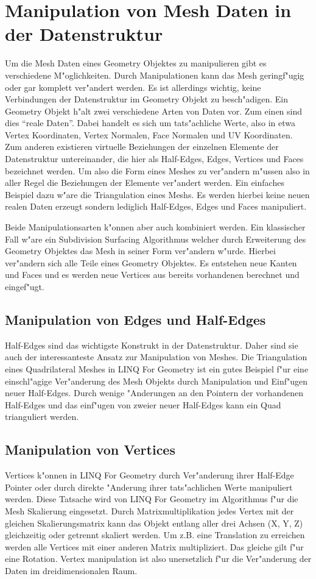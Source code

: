 \documentclass[pagesize, paper=a4, fontsize=12pt,titlepage=true, headings=small, headnosepline, abstractoff, liststotoc, nochapterprefix, plainheadsepline]{scrreprt}
\newcommand{\LFGS}{LINQ For Geometry }
\begin{document}
	\section {Manipulation von Mesh Daten in der Datenstruktur}
		Um die Mesh Daten eines Geometry Objektes zu manipulieren gibt es verschiedene M"oglichkeiten. Durch Manipulationen kann das Mesh geringf"ugig oder gar komplett ver"andert werden. Es ist allerdings wichtig, keine Verbindungen der Datenstruktur im Geometry Objekt zu besch"adigen. Ein Geometry Objekt h"alt zwei verschiedene Arten von Daten vor. Zum einen sind dies "`reale Daten"'. Dabei handelt es sich um tats"achliche Werte, also in etwa Vertex Koordinaten, Vertex Normalen, Face Normalen und UV Koordinaten. Zum anderen existieren virtuelle Beziehungen der einzelnen Elemente der Datenstruktur untereinander, die hier als Half-Edges, Edges, Vertices und Faces bezeichnet werden. Um also die Form eines Meshes zu ver"andern m"ussen also in aller Regel die Beziehungen der Elemente ver"andert werden. Ein einfaches Beispiel dazu w"are die Triangulation eines Meshs. Es werden hierbei keine neuen realen Daten erzeugt sondern lediglich Half-Edges, Edges und Faces manipuliert.
\newline

Beide Manipulationsarten k"onnen aber auch kombiniert werden. Ein klassischer Fall w"are ein Subdivision Surfacing Algorithmus welcher durch Erweiterung des Geometry Objektes das Mesh in seiner Form ver"andern w"urde. Hierbei ver"andern sich alle Teile eines Geometry Objektes. Es entstehen neue Kanten und Faces und es werden neue Vertices aus bereits vorhandenen berechnet und eingef"ugt. 
		\subsection {Manipulation von Edges und Half-Edges}
			Half-Edges sind das wichtigste Konstrukt in der Datenstruktur. Daher sind sie auch der interessanteste Ansatz zur Manipulation von Meshes. Die Triangulation eines Quadrilateral Meshes in \LFGS ist ein gutes Beispiel f"ur eine einschl"agige Ver"anderung des Mesh Objekts durch Manipulation und Einf"ugen neuer Half-Edges. Durch wenige "Anderungen an den Pointern der vorhandenen Half-Edges und das einf"ugen von zweier neuer Half-Edges kann ein Quad trianguliert werden.

		\subsection {Manipulation von Vertices}
			Vertices k"onnen in \LFGS durch Ver"anderung ihrer Half-Edge Pointer oder durch direkte "Anderung ihrer tats"achlichen Werte manipuliert werden. Diese Tatsache wird von \LFGS im Algorithmus f"ur die Mesh Skalierung eingesetzt. Durch Matrixmultiplikation jedes Vertex mit der gleichen Skalierungsmatrix kann das Objekt entlang aller drei Achsen (X, Y, Z) gleichzeitig oder getrennt skaliert werden. Um z.B. eine Translation zu erreichen werden alle Vertices mit einer anderen Matrix multipliziert. Das gleiche gilt f"ur eine Rotation. Vertex manipulation ist also unersetzlich f"ur die Ver"anderung der Daten im dreidimensionalen Raum.
\end{document}
